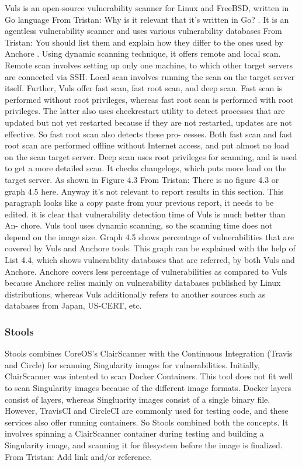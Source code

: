 \documentclass[a4paper,num-refs]{oup-contemporary}
\newcommand{\TG}[1]{\color{blue}From Tristan: #1 \color{black}}
\begin{document}
Vuls is an open-source vulnerability scanner for Linux and FreeBSD, written in Go
language \TG{Why is it relevant that it's written in Go?}.
 It is an agentless vulnerability scanner and uses various
vulnerability databases \TG{You should list them and explain how they differ to 
the ones used by Anchore}. Using dynamic scanning technique, it offers
remote and local scan. Remote scan involves setting up only one machine, to
which other target servers are connected via SSH. Local scan involves running
the scan on the target server itself. Further, Vuls offer fast scan, fast root scan,
and deep scan.
Fast scan is performed without root privileges, whereas fast root scan is
performed with root privileges. The latter also uses checkrestart utility to detect processes that are updated but not yet restarted because if they are not
restarted, updates are not effective. So fast root scan also detects these pro-
cesses. Both fast scan and fast root scan are performed offline without Internet
access, and put almost no load on the scan target server. Deep scan uses
root privileges for scanning, and is used to get a more detailed scan. It checks
changelogs, which puts more load on the target server. As shown in Figure 4.3 \TG{There is no figure 4.3 or graph 4.5 here. Anyway it's not relevant 
to report results in this section. This paragraph looks like a copy paste from your previous report, it needs to be edited.}
it is clear that vulnerability detection time of Vuls is much better than An-
chore. Vuls tool uses dynamic scanning, so the scanning time does not depend
on the image size.
Graph 4.5 shows percentage of vulnerabilities that are
covered by Vuls and Anchore tools. This graph can be explained with the help
of List 4.4, which shows vulnerability databases that are referred, by both Vuls
and Anchore. Anchore covers less percentage of vulnerabilities as compared
to Vuls because Anchore relies mainly on vulnerability databases published by
Linux distributions, whereas Vuls additionally refers to another sources such as
databases from Japan, US-CERT, etc.

\subsubsection{Stools}

Stools combines CoreOS's ClairScanner with the Continuous Integration (Travis and
Circle) for scanning Singularity images for vulnerabilities.
Initially, ClairScanner was intented to scan Docker Containers. This tool does not fit well
to scan Singularity images because of the different image formats. Docker layers
consist of layers, whereas Singluarity images consist of a single binary file.
However, TravisCI and CircleCI are commonly used for testing code, and these
services also offer running containers. So Stools combined both the concepts.
It involves spinning a ClairScanner container during testing and building a
Singularity image, and scanning it for filesystem before the image is finalized.
\TG{Add link and/or reference.}
\end{document}
